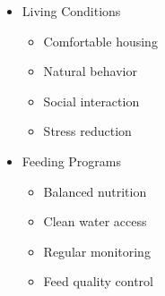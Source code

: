 \begin{itemize}
\begin{itemize}
        \item Living Conditions
        \begin{itemize}
            \item Comfortable housing
            \item Natural behavior
            \item Social interaction
            \item Stress reduction
        \end{itemize}
        
        \item Feeding Programs
        \begin{itemize}
            \item Balanced nutrition
            \item Clean water access
            \item Regular monitoring
            \item Feed quality control
        \end{itemize}
    \end{itemize}
\end{itemize}

